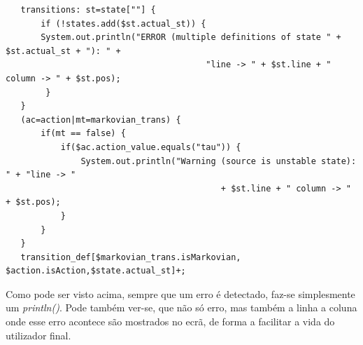 \documentclass[a4paper,11pt,openright,openbib]{article}
\begin{document}
\small
\begin{verbatim}
   transitions:	st=state[""] {	
       if (!states.add($st.actual_st)) {    	
       System.out.println("ERROR (multiple definitions of state " + $st.actual_st + "): " + 
                                        "line -> " + $st.line + " column -> " + $st.pos);
        }					
   }	
   (ac=action|mt=markovian_trans) {    	 
       if(mt == false) {		 
           if($ac.action_value.equals("tau")) {		
               System.out.println("Warning (source is unstable state): " + "line -> "
                                           + $st.line + " column -> " + $st.pos);        	
           }
       }    	
   }	 	
   transition_def[$markovian_trans.isMarkovian, $action.isAction,$state.actual_st]+;
\end{verbatim}
\normalsize

Como pode ser visto acima, sempre que um erro é detectado, faz-se simplesmente um \emph{println()}. Pode também ver-se, que não só erro, mas também a linha a coluna onde esse erro acontece são mostrados no ecrã, de forma a facilitar a vida do utilizador final. 
\end{document}
